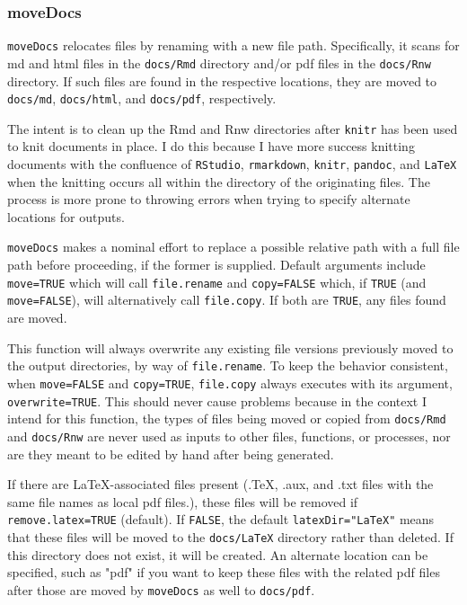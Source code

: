 \documentclass{article}\usepackage[]{graphicx}\usepackage[]{color}
\begin{document}
\title{}
\author{}
\maketitle





\subsubsection{moveDocs}
\texttt{moveDocs} relocates files by renaming with a new file path.
Specifically, it scans for md and html files in the \texttt{docs/Rmd} directory and/or pdf files in the \texttt{docs/Rnw} directory.
If such files are found in the respective locations, they are moved to \texttt{docs/md}, \texttt{docs/html}, and \texttt{docs/pdf}, respectively.

The intent is to clean up the Rmd and Rnw directories after \texttt{knitr} has been used to knit documents in place.
I do this because I have more success knitting documents with the confluence of \texttt{RStudio}, \texttt{rmarkdown}, \texttt{knitr}, \texttt{pandoc}, and \texttt{LaTeX} when the knitting occurs all within the directory of the originating files.
The process is more prone to throwing errors when trying to specify alternate locations for outputs.

\texttt{moveDocs} makes a nominal effort to replace a possible relative path with a full file path before proceeding, if the former is supplied.
Default arguments include \texttt{move=TRUE} which will call \texttt{file.rename} and \texttt{copy=FALSE} which, if \texttt{TRUE} (and \texttt{move=FALSE}), will alternatively call \texttt{file.copy}.
If both are \texttt{TRUE}, any files found are moved.

This function will always overwrite any existing file versions previously moved to the output directories, by way of \texttt{file.rename}.
To keep the behavior consistent, when \texttt{move=FALSE} and \texttt{copy=TRUE}, \texttt{file.copy} always executes with its argument, \texttt{overwrite=TRUE}.
This should never cause problems because in the context I intend for this function,
the types of files being moved or copied from \texttt{docs/Rmd} and \texttt{docs/Rnw} are never used as inputs to other files, functions, or processes,
nor are they meant to be edited by hand after being generated.

If there are LaTeX-associated files present (.TeX, .aux, and .txt files with the same file names as local pdf files.),
these files will be removed if \texttt{remove.latex=TRUE} (default).
If \texttt{FALSE}, the default \texttt{latexDir="LaTeX"} means that these files will be moved to the \texttt{docs/LaTeX} directory rather than deleted.
If this directory does not exist, it will be created.
An alternate location can be specified, such as "pdf" if you want to keep these files with the related pdf files after those are moved by \texttt{moveDocs} as well to \texttt{docs/pdf}.
\end{document}
